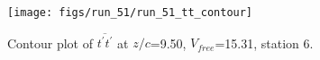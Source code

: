 \begin{figure}[H]
\centering
\texttt{[image: figs/run\_51/run\_51\_tt\_contour]}
\caption{Contour plot of $\overline{t^\prime t^\prime}$ at $z/c$=9.50, $V_{free}$=15.31, station 6.}
\end{figure}


